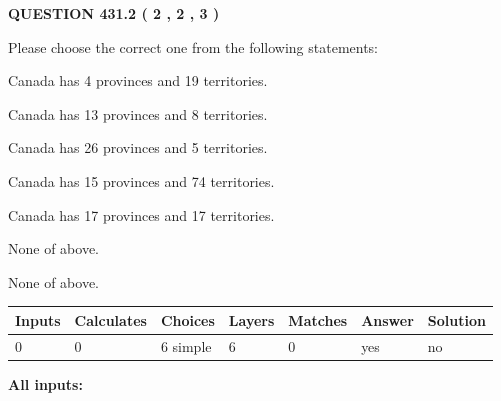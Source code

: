 \documentclass[12pt]{article}
\begin{document}
   
  
\vspace{0.2in}
  
{\textbf{\Large{QUESTION
431.2 
 ( 2 , 2 , 3 )
}}}
  
  
Please choose the correct one from the following statements:
 
 
Canada has   4 provinces and  19 territories.
 
 
Canada has  13 provinces and  8 territories.
 
 
Canada has  26 provinces and  5 territories.
 
 
Canada has  15 provinces and  74 territories.
 
 
Canada has  17 provinces and  17 territories.
 
 
 None of above.
 
 
\noindent{}
 
 
 None of above.
 
 
\noindent{}
 
 
   
   
   
   
\noindent\begin{tabular}{|l|l|l|l|l|l|l|}
 \hline
Inputs & Calculates & Choices & Layers & Matches & Answer & Solution \\ \hline
 0  & 
 0  & 
 6
  simple  
  & 
 6  & 
 0  & 
  yes & 
  no 
  \\ \hline
 \end{tabular}
   
   
   
   
\noindent{}
   
   
   
   
\noindent\vspace{0.1in}\hspace{-0.08in} {\textbf{\Large{All inputs: }}}
   
   
   
   
   
   
 \vspace{0.2in}
 
\end{document}
